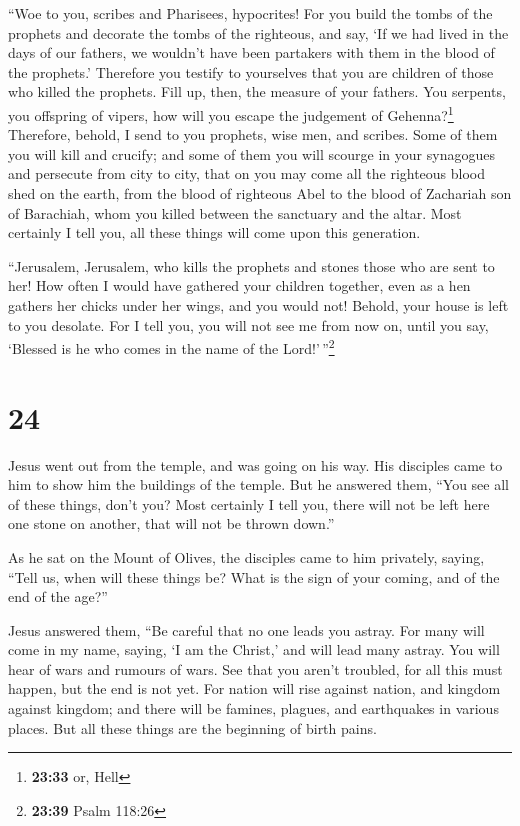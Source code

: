  ``Woe to you, scribes and Pharisees, hypocrites! For you
build the tombs of the prophets and decorate the tombs of the righteous,
 and say, `If we had lived in the days of our fathers, we
wouldn't have been partakers with them in the blood of the prophets.'
 Therefore you testify to yourselves that you are
children of those who killed the prophets.  Fill up,
then, the measure of your fathers.  You serpents, you
offspring of vipers, how will you escape the judgement of
Gehenna?\footnote{\textbf{23:33} or, Hell}  Therefore,
behold, I send to you prophets, wise men, and scribes. Some of them you
will kill and crucify; and some of them you will scourge in your
synagogues and persecute from city to city,  that on you
may come all the righteous blood shed on the earth, from the blood of
righteous Abel to the blood of Zachariah son of Barachiah, whom you
killed between the sanctuary and the altar.  Most
certainly I tell you, all these things will come upon this generation.

 ``Jerusalem, Jerusalem, who kills the prophets and
stones those who are sent to her! How often I would have gathered your
children together, even as a hen gathers her chicks under her wings, and
you would not!  Behold, your house is left to you
desolate.  For I tell you, you will not see me from now
on, until you say, `Blessed is he who comes in the name of the
Lord!'\,''\footnote{\textbf{23:39} Psalm 118:26}

\hypertarget{section-23}{%
\section{24}\label{section-23}}

 Jesus went out from the temple, and was going on his way.
His disciples came to him to show him the buildings of the temple.
 But he answered them, ``You see all of these things,
don't you? Most certainly I tell you, there will not be left here one
stone on another, that will not be thrown down.''

 As he sat on the Mount of Olives, the disciples came to
him privately, saying, ``Tell us, when will these things be? What is the
sign of your coming, and of the end of the age?''

 Jesus answered them, ``Be careful that no one leads you
astray.  For many will come in my name, saying, `I am the
Christ,' and will lead many astray.  You will hear of wars
and rumours of wars. See that you aren't troubled, for all this must
happen, but the end is not yet.  For nation will rise
against nation, and kingdom against kingdom; and there will be famines,
plagues, and earthquakes in various places.  But all these
things are the beginning of birth pains.

